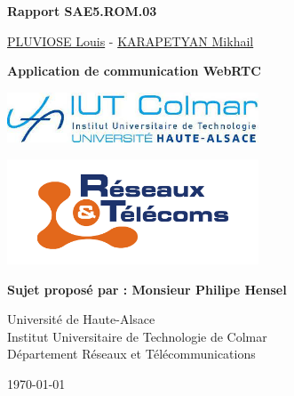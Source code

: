 \documentclass[12pt, a4paper, oneside]{article}
\begin{document}
\author{\href{https://portfolio.louispluviose.fr}{PLUVIOSE Louis} - \href{https://karap.fr}{KARAPETYAN Mikhail}}

\begin{center}
{\LARGE \textbf{Rapport SAE5.ROM.03}}

\vspace{1cm}

{\Large {\href{https://portfolio.louispluviose.fr}{PLUVIOSE Louis} - \href{https://karap.fr}{KARAPETYAN Mikhail}}}

\vspace{1cm}

{\LARGE \textbf{Application de communication WebRTC}}

\vspace{2cm}

\includegraphics[width=7.5cm]{images/logo-iut-colmar.jpg}

\vspace{0.5cm}

\includegraphics[width=7.5cm]{images/logo-but-rt.png}

\vspace{2cm}

\textbf{Sujet proposé par : Monsieur Philipe Hensel} \\

\vspace{1cm}

Université de Haute-Alsace \\
Institut Universitaire de Technologie de Colmar \\
Département Réseaux et Télécommunications \\

\vspace{3cm}

{\large \mydate\today}

\end{center}

\newpage

\tableofcontents
\end{document}
